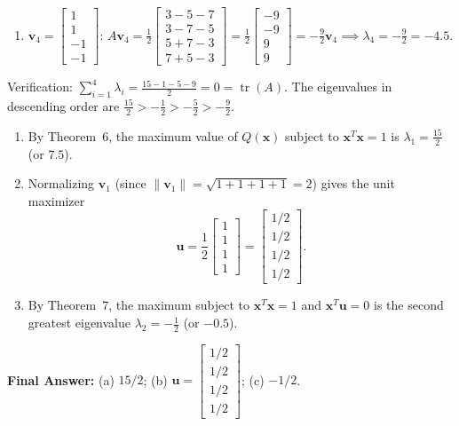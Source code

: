 \documentclass[11pt, letterpaper]{article}
\theoremstyle{definition}
\theoremstyle{remark}
\begin{document}
\begin{enumerate}[label=(\arabic*)]
    \item $\mathbf{v}_4 = \begin{bmatrix} 1 \\ 1 \\ -1 \\ -1 \end{bmatrix}$: \quad $A\mathbf{v}_4 = \frac{1}{2}\begin{bmatrix} 3-5-7 \\ 3-7-5 \\ 5+7-3 \\ 7+5-3 \end{bmatrix} = \frac{1}{2}\begin{bmatrix} -9 \\ -9 \\ 9 \\ 9 \end{bmatrix} = -\frac{9}{2}\mathbf{v}_4 \implies \lambda_4 = -\frac{9}{2} = -4.5$.
\end{enumerate}
Verification: $\sum_{i=1}^4 \lambda_i = \frac{15 - 1 - 5 - 9}{2} = 0 = \operatorname{tr}(A)$. The eigenvalues in descending order are $\frac{15}{2} > -\frac{1}{2} > -\frac{5}{2} > -\frac{9}{2}$.
\begin{enumerate}[label=(\alph*)]
    \item By Theorem~6, the maximum value of $Q(\mathbf{x})$ subject to $\mathbf{x}^T \mathbf{x} = 1$ is $\lambda_1 = \frac{15}{2}$ (or $7.5$).
    \item Normalizing $\mathbf{v}_1$ (since $\|\mathbf{v}_1\| = \sqrt{1+1+1+1} = 2$) gives the unit maximizer
    \[
    \mathbf{u} = \frac{1}{2}\begin{bmatrix} 1 \\ 1 \\ 1 \\ 1 \end{bmatrix} = \begin{bmatrix} 1/2 \\ 1/2 \\ 1/2 \\ 1/2 \end{bmatrix}.
    \]
    \item By Theorem~7, the maximum subject to $\mathbf{x}^T \mathbf{x} = 1$ and $\mathbf{x}^T \mathbf{u} = 0$ is the second greatest eigenvalue $\lambda_2 = -\frac{1}{2}$ (or $-0.5$).
\end{enumerate}

\textbf{Final Answer:} (a) $15/2$; (b) $\mathbf{u} = \begin{bmatrix} 1/2 \\ 1/2 \\ 1/2 \\ 1/2 \end{bmatrix}$; (c) $-1/2$.
\end{document}
